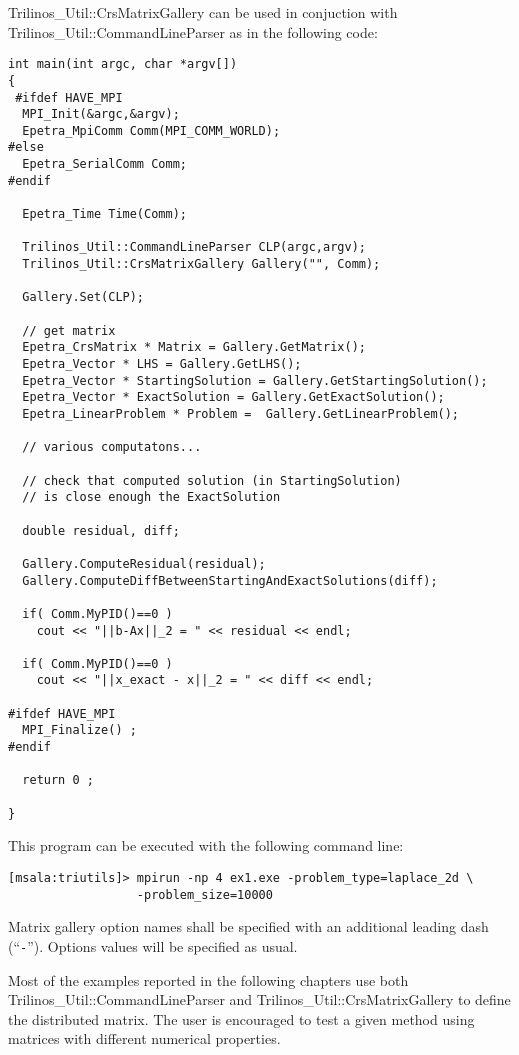 Trilinos\_Util::CrsMatrixGallery can be used in conjuction with
Trilinos\_Util::CommandLineParser as in the following code:
\begin{verbatim}
int main(int argc, char *argv[]) 
{
 #ifdef HAVE_MPI
  MPI_Init(&argc,&argv);
  Epetra_MpiComm Comm(MPI_COMM_WORLD);
#else
  Epetra_SerialComm Comm;
#endif

  Epetra_Time Time(Comm);

  Trilinos_Util::CommandLineParser CLP(argc,argv);
  Trilinos_Util::CrsMatrixGallery Gallery("", Comm);

  Gallery.Set(CLP);

  // get matrix
  Epetra_CrsMatrix * Matrix = Gallery.GetMatrix();
  Epetra_Vector * LHS = Gallery.GetLHS();
  Epetra_Vector * StartingSolution = Gallery.GetStartingSolution();
  Epetra_Vector * ExactSolution = Gallery.GetExactSolution();
  Epetra_LinearProblem * Problem =  Gallery.GetLinearProblem();

  // various computatons...

  // check that computed solution (in StartingSolution) 
  // is close enough the ExactSolution

  double residual, diff;

  Gallery.ComputeResidual(residual);
  Gallery.ComputeDiffBetweenStartingAndExactSolutions(diff);
  
  if( Comm.MyPID()==0 ) 
    cout << "||b-Ax||_2 = " << residual << endl;

  if( Comm.MyPID()==0 ) 
    cout << "||x_exact - x||_2 = " << diff << endl;

#ifdef HAVE_MPI
  MPI_Finalize() ;
#endif

  return 0 ;

}
\end{verbatim}
This program can be executed with the following command line:
\begin{verbatim}
[msala:triutils]> mpirun -np 4 ex1.exe -problem_type=laplace_2d \
                  -problem_size=10000
\end{verbatim}
Matrix gallery option names shall be specified with an additional
leading dash (``\verb!-!''). Options values will be specified as usual.

\begin{remark}
  Most of the examples reported in the following chapters use both
  Trilinos\_Util::CommandLineParser and Trilinos\_Util::CrsMatrixGallery
  to define the distributed matrix. The user is encouraged to test a
  given method using matrices with different numerical properties.
\end{remark}

